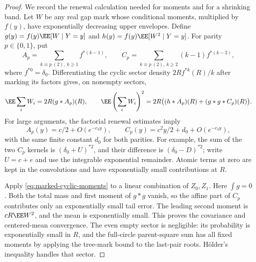 \documentclass[11pt,letterpaper]{article}
\begin{document}
\begin{proof}
We record the renewal calculation needed for moments and for
a shrinking band. Let $W$ be any real gap mark whose conditional
moments, multiplied by $f(y)$, have exponentially decreasing
upper envelopes. Define
$g(y)=f(y)\EE[W\mid Y=y]$ and
$h(y)=f(y)\EE[W^2\mid Y=y]$.
For parity $p\in\{0,1\}$, put
\[
 A_p=\sum_{k\equiv p\ (2),\ k\ge1}f^{*(k-1)},\qquad
 C_p=\sum_{k\equiv p\ (2),\ k\ge2}(k-1)f^{*(k-2)},
\]
where $f^{*0}=\delta_0$.
Differentiating the cyclic sector density
$2R f^{*k}(R)/k$ after marking its factors gives, on nonempty
sectors,
\begin{equation}\label{eq:marked-cyclic-moments}
 \EE\sum_iW_i=2R(g*A_p)(R),\qquad
 \EE\left(\sum_iW_i\right)^2
       =2R\bigl((h*A_p)(R)+(g*g*C_p)(R)\bigr).
\end{equation}
For large arguments, the factorial renewal estimates imply
\[
 A_p(y)=c/2+O(e^{-c_3y}),\qquad
 C_p(y)=c^2y/2+d_0+O(e^{-c_3y}),
\]
with the same finite constant $d_0$ for both parities.
For example, the sum of the two $C_p$ kernels is
$(\delta_0+U)^{*2}$, and their difference is
$(\delta_0-D)^{*2}$; write $U=c+e$ and use the integrable
exponential remainder. Atomic terms at zero are kept in the
convolutions and have exponentially small contributions at $R$.

Apply \eqref{eq:marked-cyclic-moments} to a linear combination
of $Z_0,Z_1$. Here $\int g=0$. Both the total mass and first
moment of $g*g$ vanish, so the affine part of $C_p$ contributes
only an exponentially small tail error. The leading second
moment is $cR\EE W^2$, and the mean is exponentially small.
This proves the covariance and centered-mean convergence.
The even empty sector is negligible: its probability is
exponentially small in $R$, and the full-circle parent-square
sum has all fixed moments by applying the tree-mark bound to
the last-pair roots. H\"older's inequality handles that sector.


\end{proof}
\end{document}
